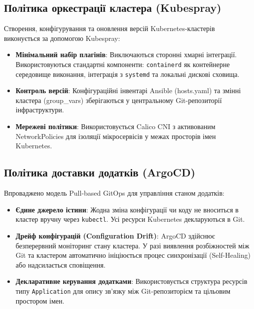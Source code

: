 \documentclass{article}
\begin{document}
\subsection{Політика оркестрації кластера (Kubespray)}
Створення, конфігурування та оновлення версій Kubernetes-кластерів виконується за допомогою Kubespray:
\begin{itemize}
    \item \textbf{Мінімальний набір плагінів}: Виключаються сторонні хмарні інтеграції. Використовуються стандартні компоненти: \texttt{containerd} як контейнерне середовище виконання, інтеграція з \texttt{systemd} та локальні дискові сховища.
    \item \textbf{Контроль версій}: Конфігураційні інвентарі Ansible (hosts.yaml) та змінні кластера (group\_vars) зберігаються у центральному Git-репозиторії інфраструктури.
    \item \textbf{Мережеві політики}: Використовується Calico CNI з активованим NetworkPolicies для ізоляції мікросервісів у межах просторів імен Kubernetes.
\end{itemize}

\subsection{Політика доставки додатків (ArgoCD)}
Впроваджено модель Pull-based GitOps для управління станом додатків:
\begin{itemize}
    \item \textbf{Єдине джерело істини}: Жодна зміна конфігурації чи коду не вноситься в кластер вручну через \texttt{kubectl}. Усі ресурси Kubernetes декларуються в Git.
    \item \textbf{Дрейф конфігурацій (Configuration Drift)}: ArgoCD здійснює безперервний моніторинг стану кластера. У разі виявлення розбіжностей між Git та кластером автоматично ініціюється процес синхронізації (Self-Healing) або надсилається сповіщення.
    \item \textbf{Декларативне керування додатками}: Використовується структура ресурсів типу \texttt{Application} для опису зв'язку між Git-репозиторієм та цільовим простором імен.
\end{itemize}
\end{document}
